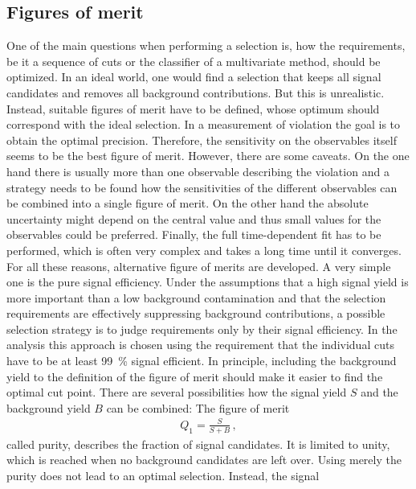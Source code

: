 
\subsection{Figures of merit}
\label{sec:dataanalysis:selection:fom}

One of the main questions when performing a selection is, how the
requirements, be it a sequence of cuts or the classifier of a multivariate
method, should be optimized. In an ideal world, one would find a selection
that keeps all signal candidates and removes all background contributions. But
this is unrealistic. Instead, suitable figures of merit have to be defined,
whose optimum should correspond with the ideal selection.  In a measurement of
\CP violation the goal is to obtain the optimal precision. Therefore, the
sensitivity on the \CP observables itself seems to be the best figure of
merit. However, there are some caveats. On the one hand there is usually more
than one observable describing the \CP violation and a strategy needs to be
found how the sensitivities of the different \CP observables can be combined
into a single figure of merit. On the other hand the absolute uncertainty
might depend on the central value and thus small values for the \CP
observables could be preferred. Finally, the full time-dependent fit has to be
performed, which is often very complex and takes a long time until it
converges. For all these reasons, alternative figure of merits are developed.
A very simple one is the pure signal efficiency. Under the assumptions that a
high signal yield is more important than a low background contamination and
that the selection requirements are effectively suppressing background
contributions, a possible selection strategy is to judge requirements only by
their signal efficiency. In the \BdToJPsiKS analysis this approach is chosen
using the requirement that the individual cuts have to be at least
\SI{99}{\percent} signal efficient. In principle, including the background
yield to the definition of the figure of merit should make it easier to find
the optimal cut point. There are several possibilities how the signal yield
$S$ and the background yield $B$ can be combined:
The figure of merit
\begin{align}
	Q_1 = \frac{S}{S + B}\,,
\end{align}
called purity, describes the fraction of signal candidates. It is limited to
unity, which is reached when no background candidates are left over. Using
merely the purity does not lead to an optimal selection. Instead, the signal
